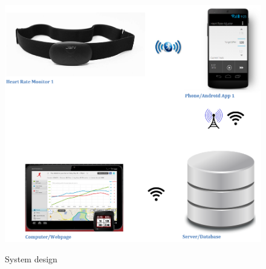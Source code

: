 \documentclass[letterpaper,english, 12pt]{scrreprt}
\begin{document}
\begin{center}
	\begin{figure}[H]
		\includegraphics{img/system_architecture.png}\\
		\caption{System design}
	\end{figure}
\end{center}
\end{document}
